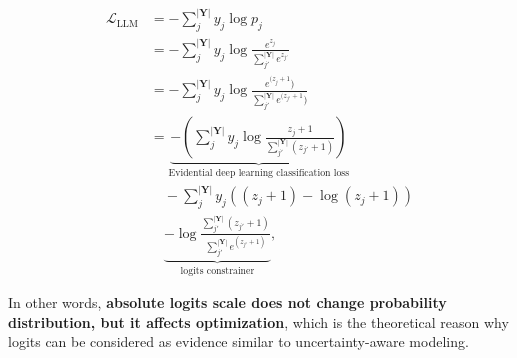 \begin{equation}
\begin{aligned}
    \mathcal{L}_\text{LLM} &= -\sum_{j}^{|\bm{Y}|}y_{j}\log p_{j} 
    \\&= -\sum_{j}^{|\bm{Y}|}y_{j}\log \frac{e^{z_{j}}}{\sum_{j'}^{|\bm{Y}|}e^{z_{j'}}} \\&= -\sum_{j}^{|\bm{Y}|}y_{j}\log \frac{e^{(z_{j}+1})}{\sum_{j'}^{|\bm{Y}|}e^{(z_{j'}+1})}  \\&= \underbrace{-\left( \sum_{j}^{|\bm{Y}|} y_{j}\log \frac{z_{j}+1}{\sum_{j'}^{|\bm{Y}|} (z_{j'}+1)} \right)}_{\text{Evidential deep learning classification loss}} \\&\quad - \sum_{j}^{|\bm{Y}|} y_{j}((z_{j}+1) - \log (z_{j}+1))  \\&\quad \underbrace{- \log \frac{\sum_{j'}^{|\bm{Y}|} (z_{j'}+1)}{\sum_{j'}^{|\bm{Y}|} e^{(z_{j'}+1)}} }_{\text{logits constrainer}},\label{eq:loss_cp}
\end{aligned}
\end{equation}

In other words, \textbf{absolute logits scale does not change probability distribution, but it affects optimization}, which is the theoretical reason why logits can be considered as evidence similar to uncertainty-aware modeling.

